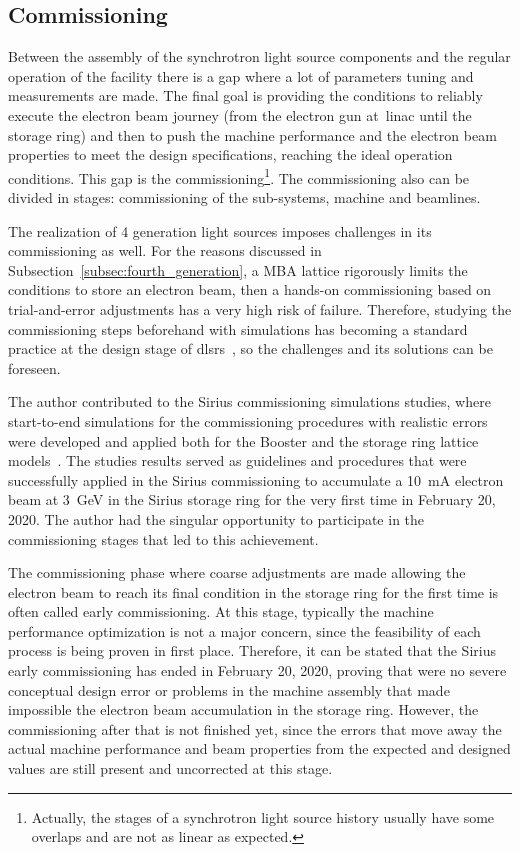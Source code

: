 \subsection{Commissioning}
Between the assembly of the synchrotron light source components and the regular operation of the facility there is a gap where a lot of parameters tuning and measurements are made. The final goal is providing the conditions to reliably execute the electron beam journey (from the electron gun at~\gls{linac} until the storage ring) and then to push the machine performance and the electron beam properties to meet the design specifications, reaching the ideal operation conditions. This gap is the commissioning\footnote{Actually, the stages of a synchrotron light source history usually have some overlaps and are not as linear as expected.}. The commissioning also can be divided in stages: commissioning of the sub-systems, machine and beamlines.

The realization of 4 generation light sources imposes challenges in its commissioning as well. For the reasons discussed in Subsection~\ref{subsec:fourth_generation}, a MBA lattice rigorously limits the conditions to store an electron beam, then a hands-on commissioning based on trial-and-error adjustments has a very high risk of failure. Therefore, studying the commissioning steps beforehand with simulations has becoming a standard practice at the design stage of \glspl{dlsr}~\cite{sajaev2015, liuzzo2017, ghasem2019, sajaev2019, hellert2019}, so the challenges and its solutions can be foreseen. 

The author contributed to the Sirius commissioning simulations studies, where start-to-end simulations for the commissioning procedures with realistic errors were developed and applied both for the Booster and the storage ring lattice models~\cite{alves2019}. The studies results served as guidelines and procedures that were successfully applied in the Sirius commissioning to accumulate a \SI{10}{\milli\ampere} electron beam at \SI{3}{\giga\electronvolt} in the Sirius storage ring for the very first time in February 20, 2020. The author had the singular opportunity to participate in the commissioning stages that led to this achievement.

The commissioning phase where coarse adjustments are made allowing the electron beam to reach its final condition in the storage ring for the first time is often called early commissioning. At this stage, typically the machine performance optimization is not a major concern, since the feasibility of each process is being proven in first place. Therefore, it can be stated that the Sirius early commissioning has ended in February 20, 2020, proving that were no severe conceptual design error or problems in the machine assembly that made impossible the electron beam accumulation in the storage ring. However, the commissioning after that is not finished yet, since the errors that move away the actual machine performance and beam properties from the expected and designed values are still present and uncorrected at this stage.

